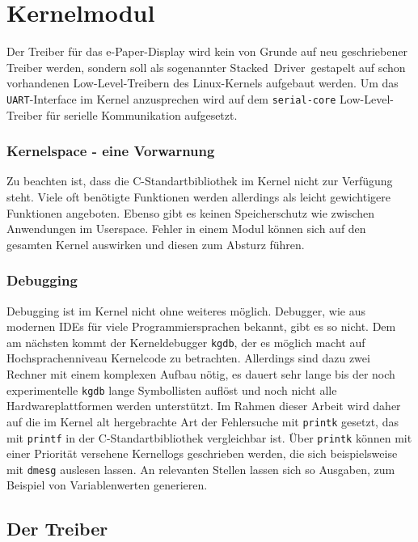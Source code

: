 
\chapter{Kernelmodul} %
Der Treiber für das e-Paper-Display wird kein von Grunde auf neu geschriebener Treiber werden, sondern soll als sogenannter \glqq Stacked~Driver\grqq~gestapelt auf schon vorhandenen Low-Level-Treibern des Linux-Kernels aufgebaut werden. 
Um das \texttt{UART}-Interface im Kernel anzusprechen wird auf dem \texttt{serial-core} Low-Level-Treiber für serielle Kommunikation aufgesetzt. 

\subsection{Kernelspace - eine Vorwarnung}
Zu beachten ist, dass die C-Standartbibliothek im Kernel nicht zur Verfügung steht. Viele oft benötigte Funktionen werden allerdings als leicht gewichtigere Funktionen angeboten. Ebenso gibt es keinen Speicherschutz wie zwischen Anwendungen im Userspace. Fehler in einem Modul können sich auf den gesamten Kernel auswirken und diesen zum Absturz führen. 

\subsection{Debugging}
Debugging ist im Kernel nicht ohne weiteres möglich. Debugger, wie aus modernen IDEs für viele Programmiersprachen bekannt, gibt es so nicht. Dem am nächsten kommt der Kerneldebugger \texttt{kgdb}, der es möglich macht auf Hochsprachenniveau Kernelcode zu betrachten. Allerdings sind dazu zwei Rechner mit einem komplexen Aufbau nötig, es dauert sehr lange bis der noch experimentelle \texttt{kgdb} lange Symbollisten auflöst und noch nicht alle Hardwareplattformen werden unterstützt. %
Im Rahmen dieser Arbeit wird daher auf die im Kernel alt hergebrachte Art der Fehlersuche mit \texttt{printk} gesetzt, das mit \texttt{printf} in der C-Standartbibliothek vergleichbar ist. Über \texttt{printk} können mit einer Priorität versehene Kernellogs geschrieben werden, die sich beispielsweise mit \texttt{dmesg} auslesen lassen. An relevanten Stellen lassen sich so Ausgaben, zum Beispiel von Variablenwerten generieren.

\section{Der Treiber}
